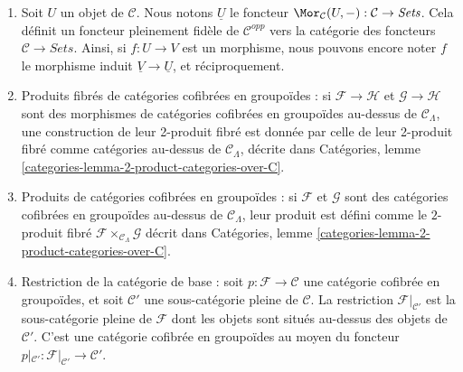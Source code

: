 \begin{remarks}
\begin{enumerate}
(\ref{item-construction-associated-cofibered-groupoid}) associe alors à $F$ une
catégorie cofibrée en ensembles. On obtient ainsi un foncteur pleinement fidèle
de la catégorie des foncteurs $\mathcal{C} \to \textit{Sets}$ vers la catégorie
des catégories cofibrées en groupoïdes au-dessus de $\mathcal{C}$.
Nous identifions la catégorie des foncteurs à son image par ce foncteur.
Ainsi, si $F : \mathcal{C} \to \textit{Sets}$ est un foncteur, nous notons aussi
par $F$ la catégorie cofibrée en ensembles associée ; et si
$\varphi : F \to G$ est un morphisme de foncteurs, nous notons encore $\varphi$
le morphisme correspondant de catégories cofibrées en ensembles, et réciproquement.
Voir Catégories, section \ref{categories-section-fibred-in-sets}.
\item
\label{item-definition-yoneda}
Soit $U$ un objet de $\mathcal{C}$. Nous notons $\underline{U}$ le
foncteur
$\Mor_\mathcal{C}(U, -): \mathcal{C} \to
\textit{Sets}$. Cela définit un foncteur pleinement fidèle de $\mathcal
C^{opp}$ vers la catégorie des foncteurs $\mathcal{C} \to
\textit{Sets}$. Ainsi, si $f : U \to V$ est un morphisme, nous pouvons
encore noter $f$ le morphisme induit $\underline{V}
\to \underline{U}$, et réciproquement.
\item
\label{item-fibre-product}
Produits fibrés de catégories cofibrées en groupoïdes : si $\mathcal{F}
\to \mathcal{H}$ et $\mathcal{G} \to \mathcal{H}$ sont des morphismes
de catégories cofibrées en groupoïdes au-dessus de $\mathcal{C}_\Lambda$, une
construction de leur 2-produit fibré est donnée par celle de leur
2-produit fibré comme catégories au-dessus de $\mathcal{C}_\Lambda$, décrite dans
Catégories, lemme \ref{categories-lemma-2-product-categories-over-C}.
\item
\label{item-product}
Produits de catégories cofibrées en groupoïdes : si $\mathcal{F}$ et
$\mathcal{G}$ sont des catégories cofibrées en groupoïdes au-dessus de
$\mathcal{C}_\Lambda$, leur produit est défini comme le $2$-produit fibré
$\mathcal{F} \times_{\mathcal{C}_\Lambda} \mathcal{G}$ décrit dans
Catégories, lemme \ref{categories-lemma-2-product-categories-over-C}.
\item
\label{item-definition-restricting-base-category}
Restriction de la catégorie de base : soit $p : \mathcal{F} \to \mathcal{C}$
une catégorie cofibrée en groupoïdes, et soit $\mathcal{C}'$ une sous-catégorie
pleine de $\mathcal{C}$. La restriction $\mathcal{F}|_{\mathcal{C}'}$
est la sous-catégorie pleine de $\mathcal{F}$ dont les objets sont situés
au-dessus des objets de $\mathcal{C}'$. C'est une catégorie cofibrée en
groupoïdes au moyen du foncteur
$p|_{\mathcal{C}'}: \mathcal{F}|_{\mathcal{C}'} \to \mathcal{C}'$.
\end{enumerate}
\end{remarks}









